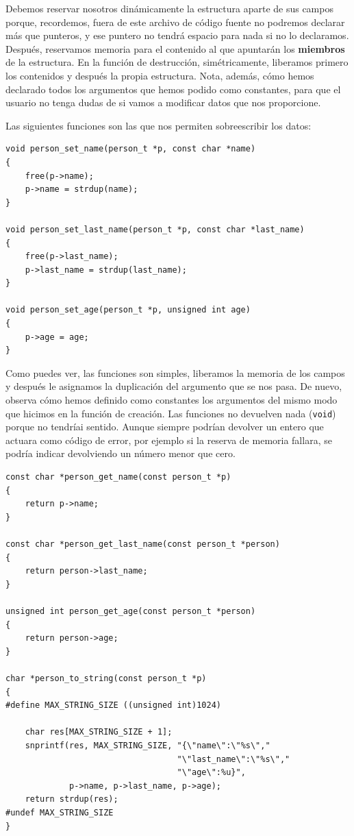 \documentclass[a4paper]{article}
\begin{document}
Debemos reservar
nosotros dinámicamente la estructura aparte de sus campos porque, recordemos,
fuera de este archivo de código fuente no podremos declarar más que punteros,
y ese puntero no tendrá espacio para nada si no lo declaramos. Después,
reservamos memoria para el contenido al que apuntarán los \textbf{miembros}
de la estructura.
En la función de destrucción, simétricamente, liberamos primero los contenidos
y después la propia estructura. Nota, además, cómo hemos declarado todos los
argumentos que hemos podido como constantes, para que el usuario no tenga dudas
de si vamos a modificar datos que nos proporcione.

Las siguientes funciones son las que nos permiten sobreescribir los datos:

\noindent
\begin{minipage}[H]{\linewidth}
\mbox{}
\begin{lstlisting}[style=C, label={lst:finalExSetter},
caption={Ejemplo final de programa -- \texttt{person.c} manipulación}]
void person_set_name(person_t *p, const char *name)
{
    free(p->name);
    p->name = strdup(name);
}

void person_set_last_name(person_t *p, const char *last_name)
{
    free(p->last_name);
    p->last_name = strdup(last_name);
}

void person_set_age(person_t *p, unsigned int age)
{
    p->age = age;
}
\end{lstlisting}
\end{minipage}

Como puedes ver, las funciones son simples, liberamos la memoria de los campos
y después le asignamos la duplicación del argumento que se nos pasa. De nuevo,
observa cómo hemos definido como constantes los argumentos del mismo modo que
hicimos en la función de creación. Las funciones no devuelven nada (\verb!void!)
porque no tendríai sentido. Aunque siempre podrían devolver un entero que
actuara como código de error, por ejemplo si la reserva de memoria fallara,
se podría indicar devolviendo un número menor que cero.

\noindent
\begin{minipage}[H]{\linewidth}
\mbox{}
\begin{lstlisting}[style=C, label={lst:finalExGetter},
caption={Ejemplo final de programa -- \texttt{person.c} recuperación}]
const char *person_get_name(const person_t *p)
{
    return p->name;
}

const char *person_get_last_name(const person_t *person)
{
    return person->last_name;
}

unsigned int person_get_age(const person_t *person)
{
    return person->age;
}

char *person_to_string(const person_t *p)
{
#define MAX_STRING_SIZE ((unsigned int)1024)

    char res[MAX_STRING_SIZE + 1];
    snprintf(res, MAX_STRING_SIZE, "{\"name\":\"%s\","
                                   "\"last_name\":\"%s\","
                                   "\"age\":%u}",
             p->name, p->last_name, p->age);
    return strdup(res);
#undef MAX_STRING_SIZE
}
\end{lstlisting}
\end{minipage}
\end{document}
